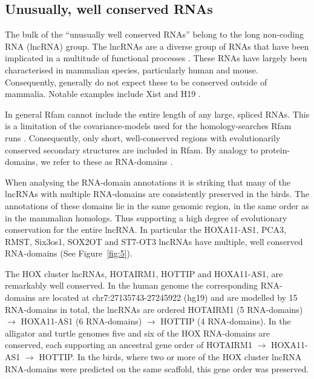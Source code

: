 \documentclass[10pt]{bmc_article}
\newenvironment{bmcformat}{\begin{raggedright}\baselineskip20pt\sloppy\setboolean{publ}{false}}{\end{raggedright}\baselineskip20pt\sloppy}
\begin{document}
\begin{bmcformat}
\subsection*{Unusually, well conserved RNAs}

The bulk of the ``unusually well conserved RNAs'' belong to the long
non-coding RNA (lncRNA) group.  The lncRNAs are a diverse group of
RNAs that have been implicated in a multitude of functional processes
\cite{Rinn:2007,Chow:2005,Guttman:2009}. These RNAs have largely been
characterised in mammalian species, particularly human and
mouse. Consequently, generally do not expect these to be conserved
outside of mammalia. Notable examples include Xist \cite{Duret:2006}
and H19 \cite{Smits:2008}.

In general Rfam cannot include the entire length of any large, spliced
RNAs. This is a limitation of the covariance-models used for the
homology-searches Rfam runs \cite{Nawrocki:2009}. Consequently, only
short, well-conserved regions with evolutionarily conserved secondary
structures are included in Rfam. By analogy to protein-domains, we
refer to these as RNA-domains \cite{Burge:2013}.

When analysing the RNA-domain annotations it is striking that many of
the lncRNAs with multiple RNA-domains are consistently preserved in
the birds. The annotations of these domains lie in the same genomic
region, in the same order as in the mammalian homologs. Thus
supporting a high degree of evolutionary conservation for the entire
lncRNA. In particular the HOXA11-AS1, PCA3, RMST, Six3os1, SOX2OT and
ST7-OT3 lncRNAs have multiple, well conserved RNA-domains (See
Figure~\ref{fig:5}).

The HOX cluster lncRNAs, HOTAIRM1, HOTTIP and HOXA11-AS1, are
remarkably well conserved. In the human genome the corresponding
RNA-domains are located at chr7:27135743-27245922 (hg19) and are
modelled by 15 RNA-domains in total, the %
lncRNAs are ordered HOTAIRM1 (5 RNA-domains) $\rightarrow$ HOXA11-AS1
(6 RNA-domains) $\rightarrow$ HOTTIP (4 RNA-domains). In the alligator
and turtle genomes five and six of the HOX RNA-domains are conserved,
each supporting an ancestral gene order of HOTAIRM1 $\rightarrow$
HOXA11-AS1 $\rightarrow$ HOTTIP. In the birds, where two or more of
the HOX cluster lncRNA RNA-domains were predicted on the same
scaffold, this gene order was preserved.


\end{bmcformat}
\end{document}
